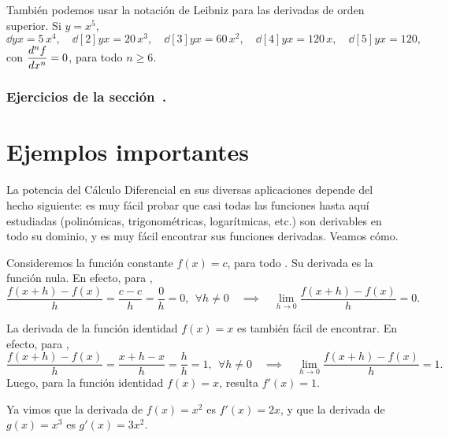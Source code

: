 También podemos usar la notación de Leibniz para las derivadas de orden superior. Si $y=x^5$,
\[
\dd{y}{x}=5\,x^4,\quad
\dd[2]{y}{x}=20\,x^3,\quad
\dd[3]{y}{x}=60\,x^2,\quad
\dd[4]{y}{x}=120\,x,\quad
\dd[5]{y}{x}=120,\quad
\]
con $\D\dd[n]{f}{x}=0$, para todo $n\ge 6$.




\subsubsection*{Ejercicios de la sección~.}

\begin{enumerate}

\end{enumerate}


\section{Ejemplos importantes}

La potencia del Cálculo Diferencial en sus diversas aplicaciones depende del hecho siguiente: es muy fácil probar que casi todas las funciones hasta aquí estudiadas (polinómicas, trigonométricas, logarítmicas, etc.) son derivables en todo su dominio, y es muy fácil encontrar sus funciones derivadas. Veamos cómo.

\begin{example}
    Consideremos la función constante $f(x)=c$, para todo \xiR. Su derivada es la función nula. En efecto, para \xiR,
    \[
    \frac{f(x+h)-f(x)}{h} = \frac{c-c}h = \frac0h = 0,\ \ \forall h\neq 0
    \quad\implies\quad
    \lim_{h\to0}\frac{f(x+h)-f(x)}{h} = 0.
    \]
\end{example}

\begin{example}
    La derivada de la función identidad $f(x)=x$ es también fácil de encontrar.  En efecto, para \xiR,
    \[
    \frac{f(x+h)-f(x)}{h} = \frac{x+h-x}h = \frac hh = 1,\ \ \forall h\neq 0
    \quad\implies\quad
    \lim_{h\to0}\frac{f(x+h)-f(x)}{h} = 1.
    \]
    Luego, para la función identidad $f(x)=x$, resulta $f'(x)=1$.
\end{example}

\begin{example}
    Ya vimos que la derivada de $f(x)=x^2$ es $f'(x)=2x$, y que la derivada de $g(x)=x^3$ es $g'(x)=3x^2$.
\end{example}

